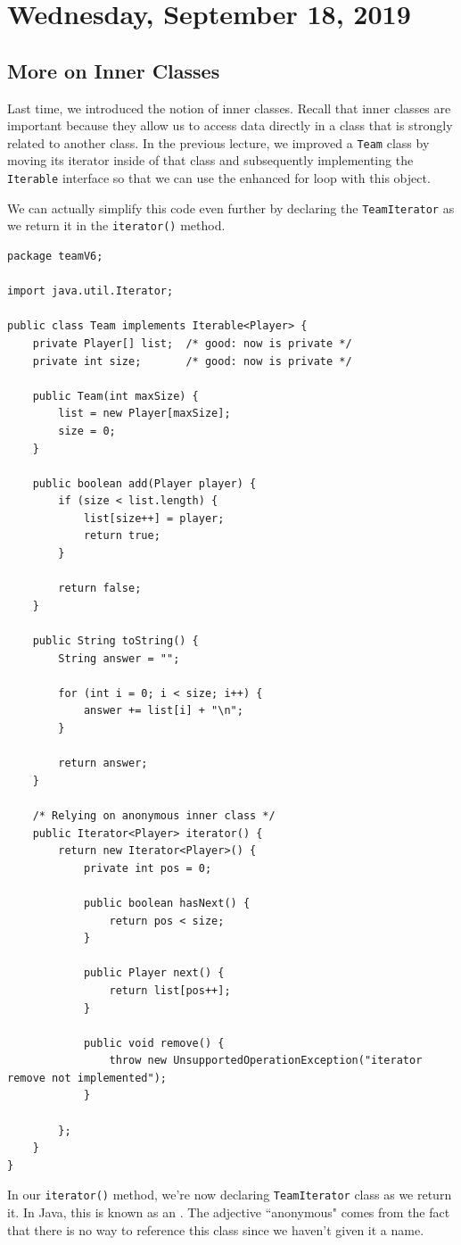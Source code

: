 \section{Wednesday, September 18, 2019}
\subsection{More on Inner Classes}
Last time, we introduced the notion of inner classes. Recall that inner classes are important because they allow us to access data directly in a class that is strongly related to another class. In the previous lecture, we improved a \verb!Team! class by moving its iterator inside of that class and subsequently implementing the \verb!Iterable! interface so that we can use the enhanced for loop with this object. 

We can actually simplify this code even further by declaring the \verb!TeamIterator! as we return it in the \verb!iterator()! method. 

\begin{lstlisting}
package teamV6;

import java.util.Iterator;

public class Team implements Iterable<Player> {
	private Player[] list;  /* good: now is private */
	private int size;	    /* good: now is private */
	
	public Team(int maxSize) {
		list = new Player[maxSize];
		size = 0;
	}
	
	public boolean add(Player player) {
		if (size < list.length) {
			list[size++] = player;
			return true;
		}
		
		return false;
	}
	
	public String toString() {
		String answer = "";
		
		for (int i = 0; i < size; i++) { 
			answer += list[i] + "\n";
		}
		
		return answer;
	}

	/* Relying on anonymous inner class */
	public Iterator<Player> iterator() {
		return new Iterator<Player>() {
			private int pos = 0;
			
			public boolean hasNext() {
				return pos < size;
			}
			
			public Player next() {
				return list[pos++];
			}
			
			public void remove() {
				throw new UnsupportedOperationException("iterator remove not implemented");
			}
			
		};
	}
}
\end{lstlisting}
In our \verb!iterator()! method, we're now declaring \verb!TeamIterator! class as we return it. In Java, this is known as an . The adjective ``anonymous" comes from the fact that there is no way to reference this class since we haven't given it a name. 

